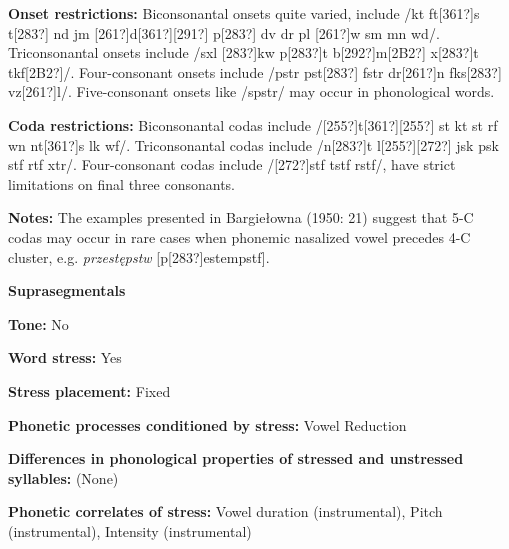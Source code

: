 \begin{styleBody}
\textbf{Onset restrictions: }Biconsonantal onsets quite varied, include /kt ft[361?]s t[283?] nd jm [261?]d[361?][291?] p[283?] dv dr pl [261?]w sm mn wd/. Triconsonantal onsets include /sxl [283?]kw p[283?]t b[292?]m[2B2?] x[283?]t tkf[2B2?]/. Four-consonant onsets include /pstr pst[283?] fstr dr[261?]n fks[283?] vz[261?]l/. Five-consonant onsets like /spstr/ may occur in phonological words.
\end{styleBody}

\begin{styleBody}
\textbf{Coda restrictions: }Biconsonantal codas include /[255?]t[361?][255?] st kt st rf wn nt[361?]s lk wf/. Triconsonantal codas include /n[283?]t l[255?][272?] jsk psk stf rtf xtr/. Four-consonant codas include /[272?]stf tstf rstf/, have strict limitations on final three consonants.
\end{styleBody}

\begin{styleBody}
\textbf{Notes: }The examples presented in Bargiełowna (1950: 21) suggest that 5-C codas may occur in rare cases when phonemic nasalized vowel precedes 4-C cluster, e.g. \textit{przestępstw }[p[283?]estempstf].
\end{styleBody}

\begin{styleBody}
\textbf{Suprasegmentals}
\end{styleBody}

\begin{styleBody}
\textbf{Tone:} No
\end{styleBody}

\begin{styleBody}
\textbf{Word stress:} Yes
\end{styleBody}

\begin{styleBody}
\textbf{Stress placement:} Fixed
\end{styleBody}

\begin{styleBody}
\textbf{Phonetic processes conditioned by stress:} Vowel Reduction
\end{styleBody}

\begin{styleBody}
\textbf{Differences in phonological properties of stressed and unstressed syllables:} (None)
\end{styleBody}

\begin{styleBody}
\textbf{Phonetic correlates of stress: }Vowel duration (instrumental), Pitch (instrumental), Intensity (instrumental)
\end{styleBody}

